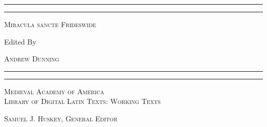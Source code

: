 \documentclass[a4paper, 11pt, oneside]{book} %
\begin{document}
\begin{titlepage} %
\centering %
\scshape %

\vspace*{\baselineskip} %

\rule{\textwidth}{1.6pt}\vspace*{-\baselineskip}\vspace*{2pt} %
\rule{\textwidth}{0.4pt} %

\vspace{1\baselineskip} %

\textsc{\Huge Miracula sancte Frideswide} %

\vspace{2.25\baselineskip} %


Edited By

\vspace{0.5\baselineskip} %

{\scshape\LARGE Andrew Dunning} %

\vspace{0.5\baselineskip} %
\rule{\textwidth}{0.4pt}\vspace*{-\baselineskip}\vspace{3.2pt} %
\rule{\textwidth}{1.6pt} %

\vspace{8\baselineskip} %
{\scshape\Large Medieval Academy of America}\\
\medskip %
{\scshape\Large Library of Digital Latin Texts: Working Texts}\\
\vspace{2\baselineskip} %

{\scshape \normalsize Samuel J. Huskey, General Editor}\\


\end{titlepage}
\end{document}
